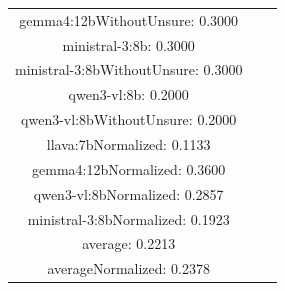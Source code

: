\documentclass[a4paper]{article}
\begin{document}
\begin{tabular}{ccc}
gemma4:12bWithoutUnsure: 0.3000 \\ ministral-3:8b: 0.3000 \\ ministral-3:8bWithoutUnsure: 0.3000 \\ qwen3-vl:8b: 0.2000 \\ qwen3-vl:8bWithoutUnsure: 0.2000 \\ llava:7bNormalized: 0.1133 \\ gemma4:12bNormalized: 0.3600 \\ qwen3-vl:8bNormalized: 0.2857 \\ ministral-3:8bNormalized: 0.1923 \\ average: 0.2213 \\ averageNormalized: 0.2378 \end{minipage}\\
\end{tabular}

\vspace{5mm}
\end{document}
